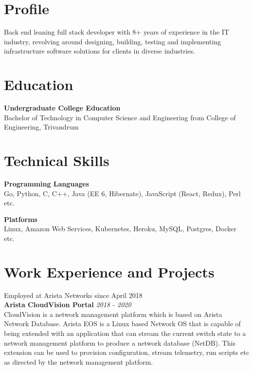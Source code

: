 \documentclass[line,margin]{res}
\begin{document}

\address{jojiantony@yandex.com}
\address{+91 96323 41954}

\begin{resume}

\section{Profile}
Back end leaning full stack developer with 8+ years of experience in the IT industry, revolving around designing, building, testing and implementing infrastructure software solutions for clients in diverse industries.

\section{Education}
{\bf Undergraduate College Education}\\
Bachelor of Technology in Computer Science and Engineering from College of Engineering, Trivandrum\\

\section{Technical Skills}

{\bf Programming Languages}\\
Go, Python, C, C++, Java (EE 6, Hibernate), JavaScript (React, Redux), Perl etc.

{\bf Platforms}\\
Linux, Amazon Web Services, Kubernetes, Heroku, MySQL, Postgres, Docker etc.

\section{Work Experience and Projects}

Employed at Arista Networks since April 2018\\

{\bf Arista CloudVision Portal} \hfill {\it{2018 - 2020}}\\

CloudVision is a network management platform which is based on Arista Network Database. Arista EOS is a Linux based Network OS that is capable of being extended with an application that can stream the current switch state to a network management platform to produce a network database (NetDB). This extension can be used to provision configuration, stream telemetry, run scripts etc as directed by the network management platform. 


\end{resume}
\end{document}
